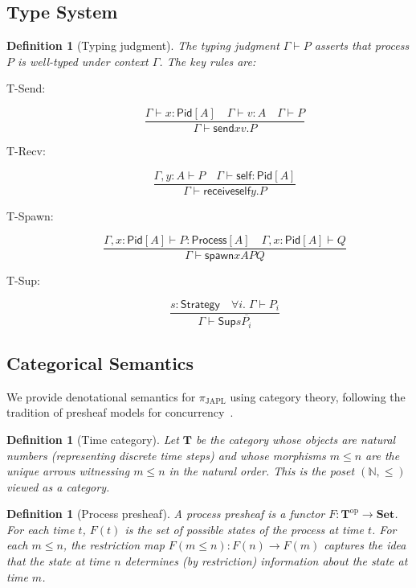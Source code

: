 \documentclass[11pt,a4paper]{article}
\newtheorem{definition}[theorem]{Definition}
\newcommand{\Pid}{\mathsf{Pid}}
\newcommand{\Sup}{\mathsf{Sup}}
\newcommand{\spawn}{\mathsf{spawn}}
\newcommand{\sendf}{\mathsf{send}}
\newcommand{\recvf}{\mathsf{receive}}
\newcommand{\Cat}[1]{\mathbf{#1}}
\newcommand{\Set}{\Cat{Set}}
\newcommand{\op}{\mathrm{op}}
\begin{document}
\subsection{Type System}

\begin{definition}[Typing judgment]\label{def:typejudge}
The typing judgment $\Gamma \vdash P$ asserts that process $P$ is well-typed under context $\Gamma$. The key rules are:

\begin{description}
\item[T-Send:]
\[
\frac{\Gamma \vdash x : \Pid[A] \quad \Gamma \vdash v : A \quad \Gamma \vdash P}{\Gamma \vdash \sendf{x}{v}.P}
\]

\item[T-Recv:]
\[
\frac{\Gamma, y : A \vdash P \quad \Gamma \vdash \mathsf{self} : \Pid[A]}{\Gamma \vdash \recvf{\mathsf{self}}{y}.P}
\]

\item[T-Spawn:]
\[
\frac{\Gamma, x : \Pid[A] \vdash P : \mathsf{Process}[A] \quad \Gamma, x : \Pid[A] \vdash Q}{\Gamma \vdash \spawn{x}{A}{P}{Q}}
\]

\item[T-Sup:]
\[
\frac{s : \mathsf{Strategy} \quad \forall i.\; \Gamma \vdash P_i}{\Gamma \vdash \Sup{s}{\overline{P_i}}}
\]
\end{description}
\end{definition}

\subsection{Categorical Semantics}

We provide denotational semantics for $\pi_{\text{JAPL}}$ using category theory, following the tradition of presheaf models for concurrency~\citep{joyal1996bisimulation,cattani1997presheaf}.

\begin{definition}[Time category]\label{def:timecat}
Let $\Cat{T}$ be the category whose objects are natural numbers (representing discrete time steps) and whose morphisms $m \leq n$ are the unique arrows witnessing $m \leq n$ in the natural order. This is the poset $(\mathbb{N}, \leq)$ viewed as a category.
\end{definition}

\begin{definition}[Process presheaf]\label{def:procpresheaf}
A \emph{process presheaf} is a functor $F : \Cat{T}^{\op} \to \Set$. For each time $t$, $F(t)$ is the set of possible states of the process at time $t$. For each $m \leq n$, the restriction map $F(m \leq n) : F(n) \to F(m)$ captures the idea that the state at time $n$ determines (by restriction) information about the state at time $m$.
\end{definition}
\end{document}
